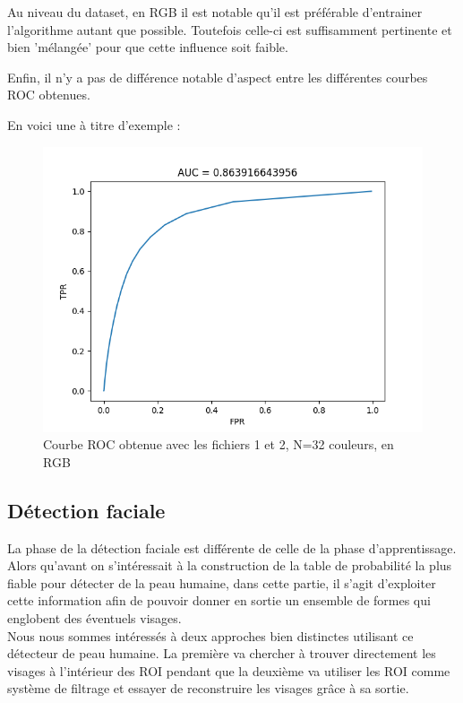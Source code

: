 \documentclass[a4paper,11pt]{article}
\begin{document}
Au niveau du dataset, en RGB il est notable qu'il est préférable d'entrainer l'algorithme autant que possible. Toutefois celle-ci est suffisamment pertinente et bien 'mélangée' pour que cette influence soit faible.

Enfin, il n'y a pas de différence notable d'aspect entre les différentes courbes ROC obtenues.

En voici une à titre d'exemple :

\begin{figure}[H]
\begin{center}
    \includegraphics[scale=0.5]{ROC_8_RGB.png}
    \caption{Courbe ROC obtenue avec les fichiers 1 et 2, N=32 couleurs, en RGB}
\end{center}
\end{figure}

\subsection{Détection faciale}

La phase de la détection faciale est différente de celle de la phase d'apprentissage. 
Alors qu'avant on s'intéressait à la construction de la table de probabilité la plus fiable pour détecter de la peau humaine, dans cette partie, il s'agit d'exploiter cette information afin de pouvoir donner en sortie un ensemble de formes qui englobent des éventuels visages.\\
\newline
Nous nous sommes intéressés à deux approches bien distinctes utilisant ce \og détecteur de peau humaine\fg{}. 
La première va chercher à trouver directement les visages à l'intérieur des ROI pendant que la deuxième va utiliser les ROI comme système de filtrage et essayer de reconstruire les visages grâce à sa sortie.
\newline
\end{document}
